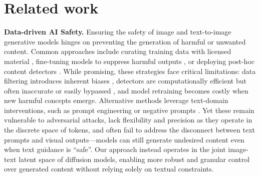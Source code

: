 \section{Related work}
\label{sec:related_work}

\noindent\textbf{Data-driven AI Safety.} Ensuring the safety of image and text-to-image generative models hinges on preventing the generation of harmful or unwanted content.
%
Common approaches include curating training data with licensed material \cite{adobefirefly, DBLP:conf/nips/SchuhmannBVGWCC22}, fine-tuning models to suppress harmful outputs \cite{DBLP:conf/cvpr/RombachBLEO22, DBLP:journals/corr/abs-2006-11807}, or deploying post-hoc content detectors \cite{nudenet, DBLP:journals/corr/abs-2210-04610}.
%
While promising, these strategies face critical limitations: data filtering introduces inherent biases \cite{DBLP:journals/corr/abs-2006-11807}, detectors are computationally efficient but often inaccurate or easily bypassed \cite{DBLP:conf/iccv/GandikotaMFB23, remove_nsfw_detection}, and model retraining becomes costly when new harmful concepts emerge.
%
Alternative methods leverage text-domain interventions, such as prompt engineering \cite{DBLP:journals/corr/abs-2006-11807} or negative prompts \cite{DBLP:journals/corr/abs-2305-16807, DBLP:conf/cvpr/SchramowskiBDK23}.
%
Yet these remain vulnerable to adversarial attacks, lack flexibility and precision as they operate in the discrete space of tokens, and often fail to address the disconnect between text prompts and visual outputs—models can still generate undesired content even when text guidance is ``safe''.
%
Our approach instead operates in the joint image-text latent space of diffusion models, enabling more robust and granular control over generated content without relying solely on textual constraints.  


